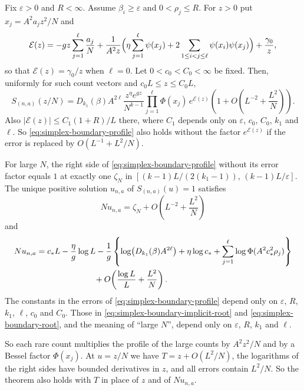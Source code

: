 \begin{theorem}
\label{thm:simplex-boundary-crossover}
Fix $\varepsilon>0$ and $R<\infty$. Assume $\beta_i\ge\varepsilon$ and
$0<\rho_j\le R$. For $z>0$ put $x_j=A^2a_jz^2/N$ and
\[
\mathcal E(z)=-gz\sum_{j=1}^\ell\frac{a_j}{N}
+\frac{1}{A^2z}\Bigl(\eta\sum_{j=1}^\ell\psi(x_j)
+2\sum_{1\le i<j\le\ell}\psi(x_i)\psi(x_j)\Bigr)+\frac{\gamma_0}{z},
\]
so that $\mathcal E(z)=\gamma_0/z$ when $\ell=0$. Let $0<c_0<C_0<\infty$ be
fixed. Then, uniformly for such count vectors and $c_0L\le z\le C_0L$,
\begin{equation}\label{eq:simplex-boundary-profile}
S_{(n,a)}(z/N)
=D_{k_1}(\beta)A^{2\ell}\frac{z^\eta e^{gz}}{N^{k-1}}
\prod_{j=1}^\ell\Phi(x_j)\,e^{\mathcal E(z)}
\left(1+O\!\left(L^{-2}+\frac{L^2}{N}\right)\right).
\end{equation}
Also $|\mathcal E(z)|\le C_1(1+R)/L$ there, where $C_1$ depends only on
$\varepsilon$, $c_0$, $C_0$, $k_1$ and $\ell$. So
\eqref{eq:simplex-boundary-profile} also holds without the factor
$e^{\mathcal E(z)}$ if the error is replaced by $O(L^{-1}+L^2/N)$.

For large $N$, the right side of \eqref{eq:simplex-boundary-profile}
without its error factor equals $1$ at exactly one $\zeta_N$ in
$[(k-1)L/(2(k_1-1)),\,(k-1)L/\varepsilon]$. The unique positive solution $u_{n,a}$ of
$S_{(n,a)}(u)=1$ satisfies
\begin{equation}\label{eq:simplex-boundary-implicit-root}
Nu_{n,a}=\zeta_N+O\!\left(L^{-2}+\frac{L^2}{N}\right)
\end{equation}
and
\begin{align}
Nu_{n,a}
={}&c_*L-\frac\eta g\log L
-\frac1g\left\{
\log\bigl(D_{k_1}(\beta)A^{2\ell}\bigr)+\eta\log c_*
+\sum_{j=1}^\ell\log\Phi(A^2c_*^2\rho_j)\right\}
\notag\\
&\hspace{20mm}+O\!\left(\frac{\log L}{L}+\frac{L^2}{N}\right).
\label{eq:simplex-boundary-root}
\end{align}
The constants in the errors of \eqref{eq:simplex-boundary-profile} depend
only on $\varepsilon$, $R$, $k_1$, $\ell$, $c_0$ and $C_0$. Those in
\eqref{eq:simplex-boundary-implicit-root} and
\eqref{eq:simplex-boundary-root}, and the meaning of ``large $N$'', depend
only on $\varepsilon$, $R$, $k_1$ and $\ell$.
\end{theorem}

So each rare count multiplies the profile of the large counts by $A^2z^2/N$ and
by a Bessel factor $\Phi(x_j)$. At $u=z/N$ we have $T=z+O(L^2/N)$, the
logarithms of the right sides have bounded derivatives in $z$, and all errors
contain $L^2/N$. So the theorem also holds with $T$ in place of $z$ and of
$Nu_{n,a}$.

